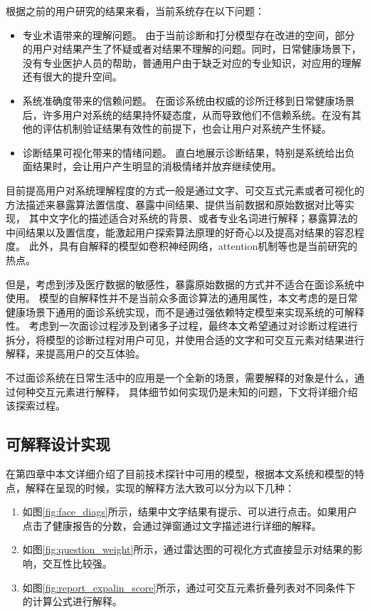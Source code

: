 根据之前的用户研究的结果来看，当前系统存在以下问题：
\begin{itemize}
    \item 专业术语带来的理解问题。
    由于当前诊断和打分模型存在改进的空间，部分的用户对结果产生了怀疑或者对结果不理解的问题。同时，日常健康场景下，没有专业医护人员的帮助，普通用户由于缺乏对应的专业知识，对应用的理解还有很大的提升空间。
    \item 系统准确度带来的信赖问题。
    在面诊系统由权威的诊所迁移到日常健康场景后，许多用户对系统的结果持怀疑态度，从而导致他们不信赖系统。在没有其他的评估机制验证结果有效性的前提下，也会让用户对系统产生怀疑。
    \item 诊断结果可视化带来的情绪问题。
    直白地展示诊断结果，特别是系统给出负面结果时，会让用户产生明显的消极情绪并放弃继续使用。
\end{itemize}


目前提高用户对系统理解程度的方式一般是通过文字、可交互式元素或者可视化的方法描述来暴露算法置信度、暴露中间结果、提供当前数据和原始数据对比等实现\cite{wang2019designing, kocielnik2019will}，
其中文字化的描述适合对系统的背景、或者专业名词进行解释；暴露算法的中间结果以及置信度，能激起用户探索算法原理的好奇心以及提高对结果的容忍程度。
此外，具有自解释的模型如卷积神经网络，attention机制等也是当前研究的热点。

但是，考虑到涉及医疗数据的敏感性，暴露原始数据的方式并不适合在面诊系统中使用。
模型的自解释性并不是当前众多面诊算法的通用属性，本文考虑的是日常健康场景下通用的面诊系统实现，而不是通过强依赖特定模型来实现系统的可解释性。
考虑到一次面诊过程涉及到诸多子过程，最终本文希望通过对诊断过程进行拆分，将模型的诊断过程对用户可见，并使用合适的文字和可交互元素对结果进行解释，来提高用户的交互体验。


不过面诊系统在日常生活中的应用是一个全新的场景，需要解释的对象是什么，通过何种交互元素进行解释，
具体细节如何实现仍是未知的问题，下文将详细介绍该探索过程。


\subsection{可解释设计实现}

在第四章中本文详细介绍了目前技术探针中可用的模型，根据本文系统和模型的特点，解释在呈现的时候，实现的解释方法大致可以分为以下几种：
\begin{enumerate}
    \item 如图\ref{fig:face_diags}所示，结果中文字结果有提示、可以进行点击。如果用户点击了健康报告的分数，会通过弹窗通过文字描述进行详细的解释。

    \item 如图\ref{fig:question_weight}所示，通过雷达图的可视化方式直接显示对结果的影响，交互性比较强。 
    
    \item 如图\ref{fig:report_expalin_score}所示，通过可交互元素折叠列表对不同条件下的计算公式进行解释。
\end{enumerate}

